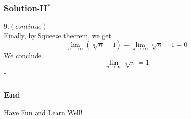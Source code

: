 \documentclass[12pt, t]{beamer}
\newcommand{\myqed}{\hfill$\square$}
\begin{document}
\begin{frame}
    \frametitle{Solution-II$^*$}
    9.$(continue)$\\
    \hspace{1em} Finally, by Squeeze theorem, we get
    \begin{equation*}
        \lim_{n\rightarrow\infty}(\sqrt[n]{n}-1)=\lim_{n\rightarrow\infty}\sqrt[n]{n}-1=0
    \end{equation*}
    \hspace{1em} We conclude
    \begin{equation*}
        \lim_{n\rightarrow\infty}\sqrt[n]{n}=1
    \end{equation*}
    \myqed
\end{frame}


\begin{frame}
    \frametitle{End}
    \vspace{2cm}
    \Huge \center  Have Fun and Learn Well!
\end{frame}
\end{document}
